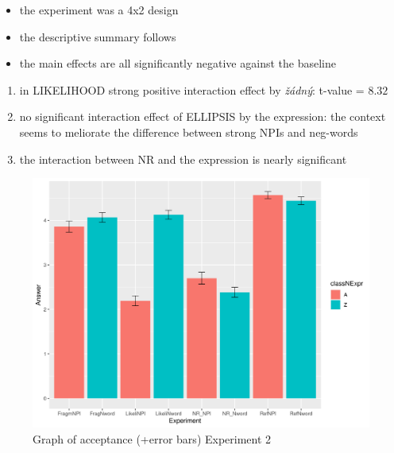 \documentclass[
  ignorenonframetext,
]{beamer}
\providecommand{\tightlist}{%
  \setlength{\itemsep}{0pt}\setlength{\parskip}{0pt}}\usepackage{longtable,booktabs,array}
\newcommand{\cond}[1]{\textsc{#1}}
\begin{document}
\begin{frame}
\begin{itemize}
\tightlist
\item
  the experiment was a 4x2 design
\item
  the descriptive summary follows
\item
  the main effects are all significantly negative against the baseline
\end{itemize}

\begin{enumerate}
\item
  in \cond{LIKELIHOOD} strong positive interaction effect by
  \emph{žádný}: t-value = \(8.32\)
\item
  no significant interaction effect of \cond{ELLIPSIS} by the
  expression: the context seems to meliorate the difference between
  strong NPIs and neg-words
\item
  the interaction between \cond{NR} and the expression is nearly
  significant
\end{enumerate}
\end{frame}

\begin{frame}
\begin{figure}

{\centering \includegraphics{"error_bar_exp_2.png"}

}

\caption{Graph of acceptance (+error bars) Experiment 2}

\end{figure}
\end{frame}
\end{document}
